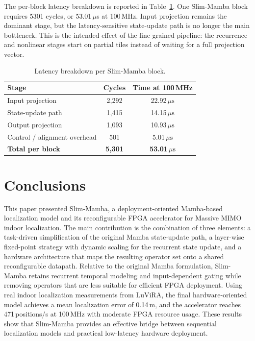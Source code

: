 \documentclass[lettersize,journal]{IEEEtran}
\begin{document}
The per-block latency breakdown is reported in
Table~\ref{tab:block_latency_tcas}. One Slim-Mamba block requires 5301 cycles,
or 53.01\(\,\mu\)s at 100\,MHz. Input projection remains the dominant stage,
but the latency-sensitive state-update path is no longer the main bottleneck. This is
the intended effect of the fine-grained pipeline: the recurrence and nonlinear
stages start on partial tiles instead of waiting for a full projection vector.

\begin{table}[!t]
\caption{Latency breakdown per Slim-Mamba block.}
\label{tab:block_latency_tcas}
\begin{center}
\footnotesize
\setlength{\tabcolsep}{6pt}
\renewcommand{\arraystretch}{1.08}
\begin{tabular}{|l|c|c|}
\hline
\textbf{Stage} & \textbf{Cycles} & \textbf{Time at 100\,MHz} \\
\hline
Input projection & 2,292 & 22.92\,\(\mu\mathrm{s}\) \\
\hline
State-update path & 1,415 & 14.15\,\(\mu\mathrm{s}\) \\
\hline
Output projection & 1,093 & 10.93\,\(\mu\mathrm{s}\) \\
\hline
Control / alignment overhead & 501 & 5.01\,\(\mu\mathrm{s}\) \\
\hline
\textbf{Total per block} & \textbf{5,301} & \textbf{53.01\,\(\mu\mathrm{s}\)} \\
\hline
\end{tabular}
\end{center}
\end{table}

\section{Conclusions}


This paper presented Slim-Mamba, a deployment-oriented Mamba-based localization
model and its reconfigurable FPGA accelerator for Massive MIMO indoor
localization. The main contribution is the combination of three elements: a
task-driven simplification of the original Mamba state-update path, a layer-wise
fixed-point strategy with dynamic scaling for the recurrent state update, and a
hardware architecture that maps the resulting operator set onto a shared
reconfigurable datapath. Relative to the original Mamba formulation,
Slim-Mamba retains recurrent temporal modeling and input-dependent gating while
removing operators that are less suitable for efficient FPGA deployment. Using
real indoor localization measurements from LuViRA, the final hardware-oriented
model achieves a mean localization error of 0.14\,m, and the accelerator
reaches 471\,positions/s at 100\,MHz with moderate FPGA resource usage. These
results show that Slim-Mamba provides an effective bridge between sequential
localization models and practical low-latency hardware deployment.
\end{document}
